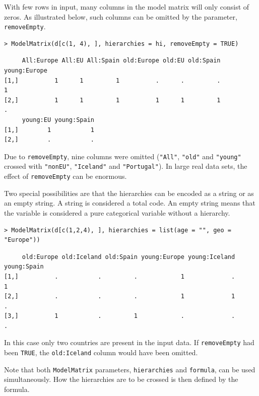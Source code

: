 With few rows in input, many columns in the model matrix will only consist of zeros. As illustrated below, such columns can be omitted by the parameter, \texttt{removeEmpty}.

\begin{verbatim}
> ModelMatrix(d[c(1, 4), ], hierarchies = hi, removeEmpty = TRUE)
\end{verbatim}

\begin{verbatim}
     All:Europe All:EU All:Spain old:Europe old:EU old:Spain young:Europe
[1,]          1      1         1          .      .         .            1
[2,]          1      1         1          1      1         1            .
     young:EU young:Spain
[1,]        1           1
[2,]        .           .
\end{verbatim}

Due to \texttt{removeEmpty}, nine columns were omitted (\texttt{"All"}, \texttt{"old"} and \texttt{"young"} crossed with \texttt{"nonEU"}, \texttt{"Iceland"} and \texttt{"Portugal"}).
In large real data sets, the effect of \texttt{removeEmpty} can be enormous.

Two special possibilities are that the hierarchies can be encoded as a string or as an empty string.
A string is considered a total code. An empty string means that the variable is considered a pure categorical variable without a hierarchy.

\begin{verbatim}
> ModelMatrix(d[c(1,2,4), ], hierarchies = list(age = "", geo = "Europe"))
\end{verbatim}

\begin{verbatim}
     old:Europe old:Iceland old:Spain young:Europe young:Iceland young:Spain
[1,]          .           .         .            1             .           1
[2,]          .           .         .            1             1           .
[3,]          1           .         1            .             .           .
\end{verbatim}

In this case only two countries are present in the input data. If \texttt{removeEmpty} had been \texttt{TRUE}, the \texttt{old:Iceland} column would have been omitted.

Note that both \texttt{ModelMatrix} parameters, \texttt{hierarchies} and \texttt{formula}, can be used simultaneously.
How the hierarchies are to be crossed is then defined by the formula.

